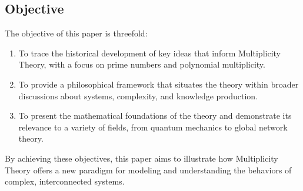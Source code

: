 \documentclass[12pt]{article}
\begin{document}
\subsection{Objective}
The objective of this paper is threefold:
\begin{enumerate}
    \item To trace the historical development of key ideas that inform Multiplicity Theory, with a focus on prime numbers and polynomial multiplicity.
    \item To provide a philosophical framework that situates the theory within broader discussions about systems, complexity, and knowledge production.
    \item To present the mathematical foundations of the theory and demonstrate its relevance to a variety of fields, from quantum mechanics to global network theory.
\end{enumerate}
By achieving these objectives, this paper aims to illustrate how Multiplicity Theory offers a new paradigm for modeling and understanding the behaviors of complex, interconnected systems.
\end{document}
